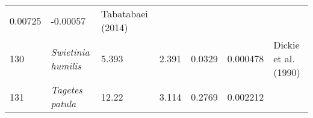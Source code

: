 \documentclass[]{article}
\begin{document}
\begin{longtable}[]{@{}lllllll@{}}
\begin{minipage}[t]{0.08\columnwidth}
0.00725\strut
\end{minipage} & \begin{minipage}[t]{0.08\columnwidth}\raggedright
-0.00057\strut
\end{minipage} & \begin{minipage}[t]{0.23\columnwidth}\raggedright
Tabatabaei (2014)\strut
\end{minipage}\tabularnewline
\begin{minipage}[t]{0.05\columnwidth}\raggedright
130\strut
\end{minipage} & \begin{minipage}[t]{0.23\columnwidth}\raggedright
\emph{Swietinia humilis}\strut
\end{minipage} & \begin{minipage}[t]{0.05\columnwidth}\raggedright
5.393\strut
\end{minipage} & \begin{minipage}[t]{0.08\columnwidth}\raggedright
2.391\strut
\end{minipage} & \begin{minipage}[t]{0.08\columnwidth}\raggedright
0.0329\strut
\end{minipage} & \begin{minipage}[t]{0.08\columnwidth}\raggedright
0.000478\strut
\end{minipage} & \begin{minipage}[t]{0.23\columnwidth}\raggedright
Dickie et al. (1990)\strut
\end{minipage}\tabularnewline
\begin{minipage}[t]{0.05\columnwidth}\raggedright
131\strut
\end{minipage} & \begin{minipage}[t]{0.23\columnwidth}\raggedright
\emph{Tagetes patula}\strut
\end{minipage} & \begin{minipage}[t]{0.05\columnwidth}\raggedright
12.22\strut
\end{minipage} & \begin{minipage}[t]{0.08\columnwidth}\raggedright
3.114\strut
\end{minipage} & \begin{minipage}[t]{0.08\columnwidth}\raggedright
0.2769\strut
\end{minipage} & \begin{minipage}[t]{0.08\columnwidth}\raggedright
0.002212\strut
\end{minipage} & \begin{minipage}[t]{0.23\columnwidth}\raggedright

\end{minipage}
\end{longtable}
\end{document}
